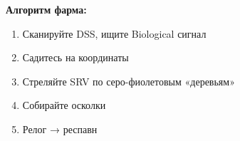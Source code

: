 \begin{tcolorbox}[edbox]
{\color{edorange}\fontsize{6.5}{8}\selectfont\bfseries Алгоритм фарма:}\\[0.5mm]
\begin{enumerate}
\item {\fontsize{6.5}{8}\selectfont Сканируйте DSS, ищите Biological сигнал}
\item {\fontsize{6.5}{8}\selectfont Садитесь на координаты}
\item {\fontsize{6.5}{8}\selectfont Стреляйте SRV по серо-фиолетовым «деревьям»}
\item {\fontsize{6.5}{8}\selectfont Собирайте осколки}
\item {\fontsize{6.5}{8}\selectfont Релог → респавн}
\end{enumerate}
\end{tcolorbox}
